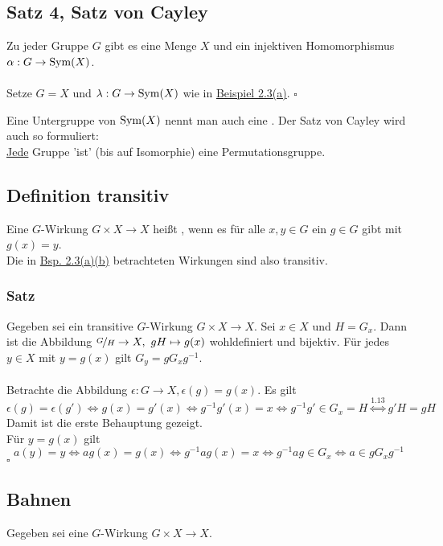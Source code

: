 \subsection{Satz 4, Satz von Cayley}
\label{sub:satz_von_cayley}
Zu jeder Gruppe $G$ gibt es eine Menge $X$ und ein injektiven Homomorphismus $\alpha:G\to \operatorname{Sym}(X)$.\\

\\
Setze $G=X$ und $\lambda:G\to \operatorname{Sym}(X)$ wie in \hyperref[sub:bsp_wirkungen]{Beispiel 2.3(a)}.
\hfill $\square$

Eine Untergruppe von $\operatorname{Sym}(X)$ nennt man auch eine . 
Der Satz von Cayley wird auch so formuliert:\\
\uline{Jede} Gruppe 'ist' (bis auf Isomorphie) eine Permutationsgruppe.

\subsection{Definition transitiv}
\label{sub:def_transitiv}
Eine $G$-Wirkung $G\times X\to X$ heißt , wenn es für alle $x,y\in G$ ein $g\in G$ gibt mit $g(x)=y$.\\
Die in \hyperref[sub:bsp_wirkungen]{Bsp. 2.3(a)(b)} betrachteten Wirkungen sind also transitiv.

\subsubsection*{Satz}
Gegeben sei ein transitive $G$-Wirkung $G\times X\to X$. Sei $x\in X$ und $H=G_x$. 
Dann ist die Abbildung $\nicefrac{G}{H}\to X,~gH\mapsto g(x)$ wohldefiniert und bijektiv. 
Für jedes $y\in X$ mit $y=g(x)$ gilt $G_y=gG_xg^{-1}$.\\

\\
Betrachte die Abbildung $\epsilon:G\to X,\epsilon(g)=g(x)$. 
Es gilt 
\[
\epsilon(g)=\epsilon(g') \Leftrightarrow g(x)=g'(x) \Leftrightarrow g^{-1}g'(x)=x \Leftrightarrow g^{-1}g'\in G_x=H \stackrel{\hyperref[sub:nebenklassen]{1.13}}{\Leftrightarrow} g'H=gH
\]
Damit ist die erste Behauptung gezeigt.\\
Für $y=g(x)$ gilt 
\[
a(y)=y \Leftrightarrow ag(x)=g(x) \Leftrightarrow g^{-1}ag(x)=x \Leftrightarrow g^{-1}ag\in G_x \Leftrightarrow a\in gG_xg^{-1}
\]
\hfill $\square$

\subsection{Bahnen}
\label{sub:bahnen}
Gegeben sei eine $G$-Wirkung $G\times X\to X$.


